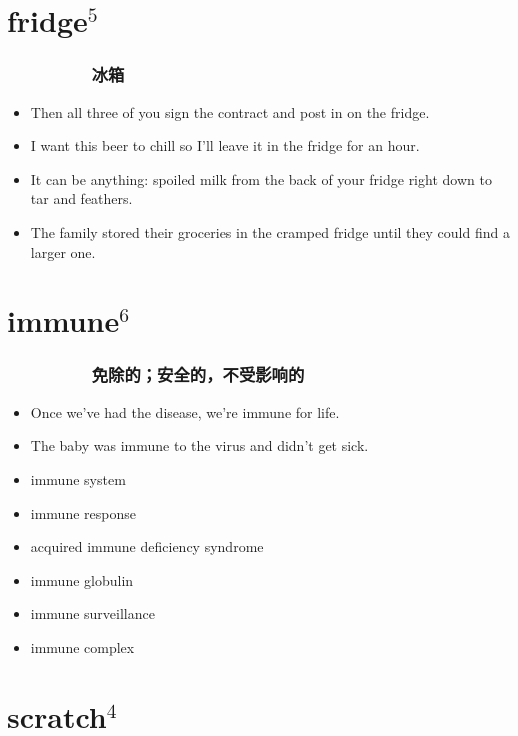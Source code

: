 \documentclass[UTF8,4pt,a3paper,space]{article}
\begin{document}
\begin{multicols}{4}
\section{fridge$^5$}
\subsubsection*{\ \ \ \ \ \ \ \ \ 冰箱}\begin{itemize}
\itemsep-0.5em
    \item Then all three of you sign the contract and post in on the fridge.    \item I want this beer to chill so I'll leave it in the fridge for an hour.    \item It can be anything: spoiled milk from the back of your fridge right down to tar and feathers.    \item The family stored their groceries in the cramped fridge until they could find a larger one. 
\end{itemize}
\hrulefill


\section{immune$^6$}
\subsubsection*{\ \ \ \ \ \ \ \ \ 免除的；安全的，不受影响的}\begin{itemize}
\itemsep-0.5em
    \item Once we’ve had the disease, we’re immune for life.    \item The baby was immune to the virus and didn't get sick. 
\end{itemize}
\begin{itemize}
\itemsep-0.5em
   \item immune system   \item immune response   \item acquired immune deficiency syndrome   \item immune globulin   \item immune surveillance   \item immune complex\end{itemize}
\hrulefill


\section{scratch$^4$}

\end{multicols}
\end{document}
